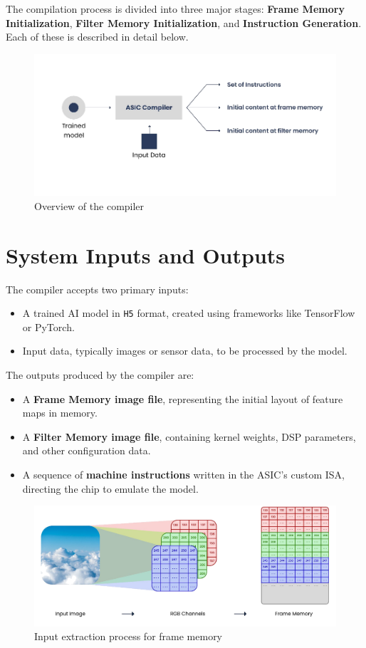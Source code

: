 \documentclass[12pt]{report}
\begin{document}
The compilation process is divided into three major stages: \textbf{Frame Memory Initialization}, \textbf{Filter Memory Initialization}, and \textbf{Instruction Generation}. Each of these is described in detail below.

\begin{figure}[!b]
\centering
  \includegraphics[width=\textwidth]{asic_dnn_compiler1.png}
  \caption{Overview of the compiler}
  \label{label1}
\end{figure}

\section{System Inputs and Outputs}

The compiler accepts two primary inputs:
\begin{itemize}
    \item A trained AI model in \texttt{H5} format, created using frameworks like TensorFlow or PyTorch.
    \item Input data, typically images or sensor data, to be processed by the model.
\end{itemize}

The outputs produced by the compiler are:
\begin{itemize}
    \item A \textbf{Frame Memory image file}, representing the initial layout of feature maps in memory.
    \item A \textbf{Filter Memory image file}, containing kernel weights, DSP parameters, and other configuration data.
    \item A sequence of \textbf{machine instructions} written in the ASIC's custom ISA, directing the chip to emulate the model.
\end{itemize}

\begin{figure}[!b]
\centering
  \includegraphics[width=\textwidth]{extract_ip_data1.png}
  \caption{Input extraction process for frame memory}
  \label{label4}
\end{figure}
\end{document}
